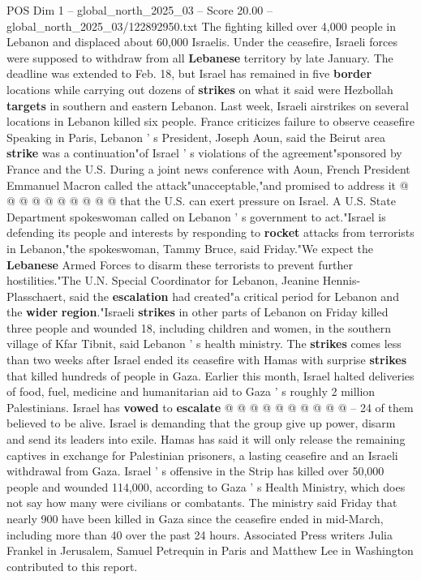 \begin{textsample}{POS Dim 1 – global\_north\_2025\_03 – Score 20.00 – global\_north\_2025\_03/122892950.txt}
The fighting killed over 4,000 people in Lebanon and displaced about 60,000 Israelis.
Under the ceasefire, Israeli forces were supposed to withdraw from all \textbf{Lebanese} territory by late January.
The deadline was extended to Feb. 18, but Israel has remained in five \textbf{border} locations while carrying out dozens of \textbf{strikes} on what it said were Hezbollah \textbf{targets} in southern and eastern Lebanon.
Last week, Israeli airstrikes on several locations in Lebanon killed six people.
France criticizes failure to observe ceasefire Speaking in Paris, Lebanon ' s President, Joseph Aoun, said the Beirut area \textbf{strike} was a continuation"of Israel ' s violations of the agreement"sponsored by France and the U.S.
During a joint news conference with Aoun, French President Emmanuel Macron called the attack"unacceptable,"and promised to address it @ @ @ @ @ @ @ @ @ @ that the U.S. can exert pressure on Israel.
A U.S.
State Department spokeswoman called on Lebanon ' s government to act."Israel is defending its people and interests by responding to \textbf{rocket} attacks from terrorists in Lebanon,"the spokeswoman, Tammy Bruce, said Friday."We expect the \textbf{Lebanese} Armed Forces to disarm these terrorists to prevent further hostilities."The U.N.
Special Coordinator for Lebanon, Jeanine Hennis-Plasschaert, said the \textbf{escalation} had created"a critical period for Lebanon and the \textbf{wider} \textbf{region}."Israeli \textbf{strikes} in other parts of Lebanon on Friday killed three people and wounded 18, including children and women, in the southern village of Kfar Tibnit, said Lebanon ' s health ministry.
The \textbf{strikes} comes less than two weeks after Israel ended its ceasefire with Hamas with surprise \textbf{strikes} that killed hundreds of people in Gaza.
Earlier this month, Israel halted deliveries of food, fuel, medicine and humanitarian aid to Gaza ' s roughly 2 million Palestinians.
Israel has \textbf{vowed} to \textbf{escalate} @ @ @ @ @ @ @ @ @ @ -- 24 of them believed to be alive.
Israel is demanding that the group give up power, disarm and send its leaders into exile.
Hamas has said it will only release the remaining captives in exchange for Palestinian prisoners, a lasting ceasefire and an Israeli withdrawal from Gaza.
Israel ' s offensive in the Strip has killed over 50,000 people and wounded 114,000, according to Gaza ' s Health Ministry, which does not say how many were civilians or combatants.
The ministry said Friday that nearly 900 have been killed in Gaza since the ceasefire ended in mid-March, including more than 40 over the past 24 hours.
Associated Press writers Julia Frankel in Jerusalem, Samuel Petrequin in Paris and Matthew Lee in Washington contributed to this report.

\end{textsample}
